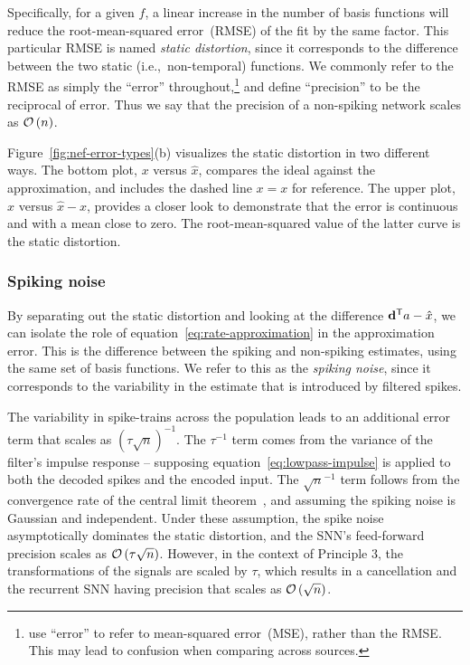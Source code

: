 Specifically, for a given $f$, a linear increase in the number of basis functions will reduce the root-mean-squared error~(RMSE) of the fit by the same factor.
This particular RMSE is named \emph{static distortion}, since it corresponds to the difference between the two static (i.e.,~non-temporal) functions.
We commonly refer to the RMSE as simply the ``error'' throughout,\footnote{%
\citet{eliasmith2003a} use ``error'' to refer to mean-squared error~(MSE), rather than the RMSE. This may lead to confusion when comparing across sources.}
and define ``precision'' to be the reciprocal of error.
Thus we say that the precision of a non-spiking network scales as $\mathcal{O}\left({n}\right)$.

Figure~\ref{fig:nef-error-types}(b) visualizes the static distortion in two different ways.
The bottom plot, $x$ versus $\hat{x}$, compares the ideal against the approximation, and includes the dashed line $x = x$ for reference.
The upper plot, $x$ versus $\hat{x} - x$, provides a closer look to demonstrate that the error is continuous and with a mean close to zero.
The root-mean-squared value of the latter curve is the static distortion.

\subsubsection{Spiking noise}

By separating out the static distortion and looking at the difference ${\mathbf{d}}^\mathsf{T}a - \hat{x}$, we can isolate the role of equation~\ref{eq:rate-approximation} in the approximation error.
This is the difference between the spiking and non-spiking estimates, using the same set of basis functions.
We refer to this as the \emph{spiking noise}, since it corresponds to the variability in the estimate that is introduced by filtered spikes.

The variability in spike-trains across the population leads to an additional error term that scales as $\left( \tau \sqrt{n} \right)^{-1}$.
The $\tau^{-1}$ term comes from the variance of the filter's impulse response -- supposing equation~\ref{eq:lowpass-impulse} is applied to both the decoded spikes and the encoded input.
The $\sqrt{n}^{-1}$ term follows from the convergence rate of the central limit theorem~\citep[CLT;][]{berry1941accuracy, esseen1942liapunov}, and assuming the spiking noise is Gaussian and independent.
Under these assumption, the spike noise asymptotically dominates the static distortion, and the SNN's feed-forward precision scales as $\mathcal{O}\left({\tau \sqrt{n}}\right)$.
However, in the context of Principle 3, the transformations of the signals are scaled by $\tau$, which results in a cancellation and the recurrent SNN having precision that scales as $\mathcal{O}\left({\sqrt{n}}\right)$.

